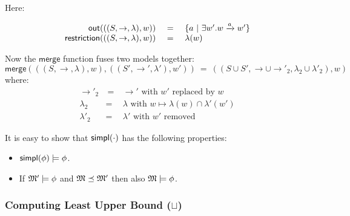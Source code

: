 \NI Here:

\[
\begin{array}{rcl}
  \mathsf{out}(((S,\rightarrow,\lambda),w)) 
     &\ =\ & \{ a \ | \  \exists w' . w \xrightarrow{a} w'\}  \\
  \mathsf{restriction}(((S,\rightarrow,\lambda),w)) 
    & = & 
  \lambda(w) 
\end{array}
\]

\NI Now the $\mathsf{merge}$ function fuses two  models together:
\[
   \mathsf{merge}( ( (S, \rightarrow, \lambda), w),  ( (S', \rightarrow', \lambda'), w')) 
      \ =\ 
   ((S \cup S', \rightarrow \cup \rightarrow'_2, \lambda_2 \cup \lambda'_2), w)
\]
where:
\begin{eqnarray*}
  \rightarrow'_2 &\ =\ & \rightarrow' \mbox{ with } w' \mbox{ replaced by } w  \\
  \lambda_2 & = & \lambda \mbox{ with } w \mapsto \lambda(w) \cap \lambda'(w')  \\
  \lambda'_2 & = & \lambda' \mbox{ with } w' \mbox{ removed } 
\end{eqnarray*}

\NI It is easy to show that $\mathsf{simpl}(\cdot)$ has the following properties:

\begin{itemize}

\item $\mathsf{simpl}(\phi) \models \phi$.

\item If $\frak{M}' \models \phi$ and  $\frak{M} \preceq \frak{M}'$ then also  $\frak{M} \models \phi$.
 
\end{itemize}

\subsubsection{Computing Least Upper Bound ($\sqcup$)}

